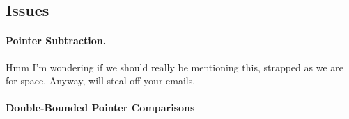 

\subsection{Issues}
\label{sec:gccsemantics}

\paragraph{Pointer Subtraction.}
{\color{blue}Hmm I'm wondering if we should really be mentioning this,
strapped as we are for space. Anyway, will steal off your emails.}


\paragraph{Double-Bounded Pointer Comparisons}







